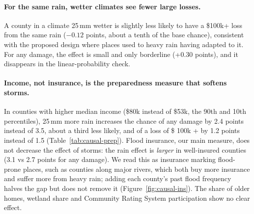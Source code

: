 \documentclass[10pt,twocolumn]{article}
\begin{document}
\paragraph{For the same rain, wetter climates see fewer large losses.} A county in a climate
25\,mm wetter is slightly less likely to have a \$100k+ loss from the same rain ($-0.12$
points, about a tenth of the base chance), consistent with the proposed design where places used to heavy rain having
adapted to it. For any damage, the effect is small and only borderline (+0.30 points), and it
disappears in the linear-probability check.

\paragraph{Income, not insurance, is the preparedness measure that softens storms.} In counties
with higher median income (\$80k instead of \$53k, the 90th and 10th percentiles), 25\,mm more rain
increases the chance of any damage by 2.4 points instead of 3.5, about a third less likely, and of a
 loss of \$ 100k + by 1.2 points instead of 1.5 (Table~\ref{tab:causal-prep}). Flood insurance, our main
measure, does not decrease the effect of storms: the rain effect is \emph{larger} in well-insured counties (3.1
vs 2.7 points for any damage). We read this as insurance marking flood-prone places, such as
counties along major rivers, which both buy more insurance and suffer more from heavy rain; adding
each county's past flood frequency halves the gap but does not remove it
(Figure~\ref{fig:causal-ins}). The share of older homes, wetland share and Community Rating System
participation show no clear effect.
\end{document}
